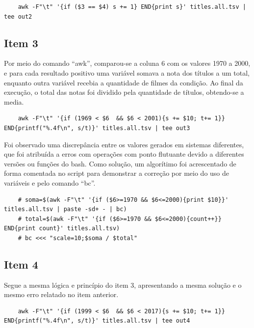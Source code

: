 \documentclass[12pt]{article}
\begin{document}
	\begin{verbatim}
	awk -F"\t" '{if ($3 == $4) s += 1} END{print s}' titles.all.tsv | tee out2
	\end{verbatim}
	
	\subsection*{Item 3}
	
	Por meio do comando ``awk'', comparou-se a coluna 6 com os valores 1970 a 2000, e para cada resultado positivo uma variável somava a nota dos títulos a um total, enquanto outra variável recebia a quantidade de filmes da condição. Ao final da execução, o total das notas foi dividido pela quantidade de títulos, obtendo-se a media.
	
	\begin{verbatim}
	awk -F"\t" '{if (1969 < $6  && $6 < 2001){s += $10; t+= 1}} END{printf("%.4f\n", s/t)}' titles.all.tsv | tee out3
	\end{verbatim}
	Foi observado uma discrepância entre os valores gerados em sistemas diferentes, que foi atribuída a erros com operações com ponto flutuante devido a diferentes versões ou funções do bash. Como solução, um algorítimo foi acrescentado de forma comentada no script para demonstrar a correção por meio do uso de variáveis e pelo comando ``bc''.
	\begin{verbatim}
	# soma=$(awk -F"\t" '{if ($6>=1970 && $6<=2000){print $10}}' titles.all.tsv | paste -sd+ - | bc) 
	# total=$(awk -F"\t" '{if ($6>=1970 && $6<=2000){count++}} END{print count}' titles.all.tsv)
	# bc <<< "scale=10;$soma / $total"
	\end{verbatim}
	\subsection*{Item 4}
	Segue a mesma lógica e princípio do item 3, apresentando a mesma solução e o mesmo erro relatado no item anterior.
	\begin{verbatim}
	awk -F"\t" '{if (1999 < $6  && $6 < 2017){s += $10; t+= 1}} END{printf("%.4f\n", s/t)}' titles.all.tsv | tee out4
	\end{verbatim}
\end{document}
